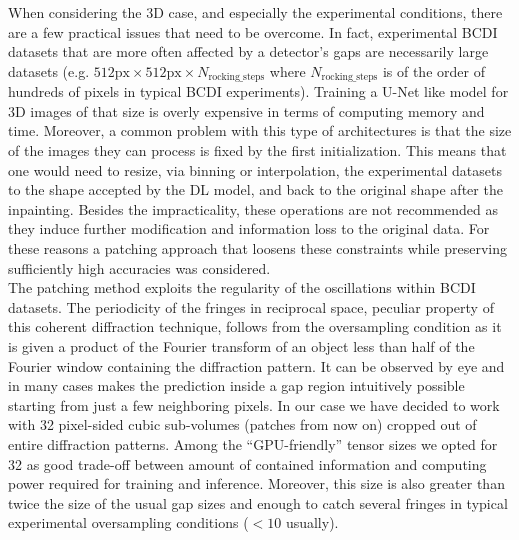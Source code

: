 When considering the 3D case, and especially the experimental conditions, there are a few practical issues that need
to be overcome. In fact, experimental BCDI datasets that are more often affected by a detector's gaps are necessarily large
datasets (e.g. $512\text{px} \times 512\text{px} \times N_{\text{rocking\_steps}}$ where $ N_{\text{rocking\_steps}}$ is of 
the order of hundreds of pixels in typical BCDI experiments). 
Training a U-Net like model for 3D images of that size is 
overly expensive in terms of computing memory and time. Moreover, a common problem with this type of architectures is that
the size of the images they can process is fixed by the first initialization. This means that one would need to resize, via 
binning or interpolation, the experimental datasets to the shape accepted by the DL model, and back to the original
shape after the inpainting. Besides the impracticality, these operations are not recommended as they induce further
modification and information loss to the original data. For these reasons a patching approach that 
loosens these constraints while preserving sufficiently high accuracies was considered. \\

The patching method exploits the regularity of the oscillations within BCDI datasets. The periodicity of the fringes 
in reciprocal space, peculiar property of this coherent diffraction technique, follows from the oversampling condition 
as it is given a product of the Fourier transform 
of an object less than half of the Fourier window containing the diffraction pattern. It can be observed by eye and 
in many cases makes the prediction inside a gap region intuitively possible starting from just a few neighboring pixels. 
In our case we have decided to work with 32 pixel-sided cubic sub-volumes (patches from now on) cropped out of entire diffraction 
patterns. Among the ``GPU-friendly'' tensor sizes \cite{nvidia_tensor_cores_optimization} we opted for 32 as good trade-off
between amount of contained information and computing power required for training and inference. Moreover, this size is 
also greater than twice the size of the usual gap sizes and enough to catch several fringes in typical experimental 
oversampling conditions ($< 10$ usually). 

